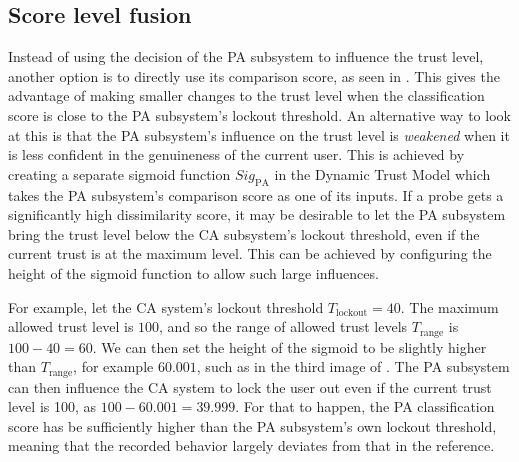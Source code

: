 \subsection{Score level fusion}
\label{sec:system-design-combined-score}
Instead of using the decision of the PA subsystem to influence the trust level, another option is to directly use its comparison score, as seen in .
This gives the advantage of making smaller changes to the trust level when the classification score is close to the PA subsystem's lockout threshold.
An alternative way to look at this is that the PA subsystem's influence on the trust level is \textit{weakened} when it is less confident in the genuineness of the current user.
This is achieved by creating a separate sigmoid function $\textit{Sig}_{\text{PA}}$ in the Dynamic Trust Model which takes the PA subsystem's comparison score as one of its inputs.
If a probe gets a significantly high dissimilarity score, it may be desirable to let the PA subsystem bring the trust level below the CA subsystem's lockout threshold, even if the current trust is at the maximum level.
This can be achieved by configuring the height of the sigmoid function to allow such large influences.

For example, let the CA system's lockout threshold $T_{\text{lockout}} = 40$.
The maximum allowed trust level is $100$, and so the range of allowed trust levels $T_{\text{range}}$ is $100-40 = 60$.
We can then set the height of the sigmoid to be slightly higher than $T_{\text{range}}$, for example $60.001$, such as in the third image of .
The PA subsystem can then influence the CA system to lock the user out even if the current trust level is 100, as $100-60.001 = 39.999$.
For that to happen, the PA classification score has be sufficiently higher than the PA subsystem's own lockout threshold, meaning that the recorded behavior largely deviates from that in the reference.


